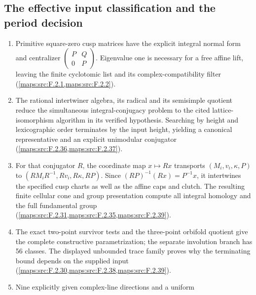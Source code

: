 \subsection{The effective input classification and the period decision}
\RungOne
\begin{enumerate}[label=\arabic*.]
\item Primitive square-zero cusp matrices have the explicit integral
  normal form and centralizer
  $\left(\begin{smallmatrix}P&Q\\0&P\end{smallmatrix}\right)$.
  Eigenvalue one is necessary for a free affine lift, leaving the
  finite cyclotomic list and its complex-compatibility filter
  (\cref{maps:src:F.2.1,maps:src:F.2.2}).
\item The rational intertwiner algebra, its radical and its
  semisimple quotient reduce the simultaneous integral-conjugacy
  problem to the cited lattice-isomorphism algorithm in its verified
  hypothesis.  Searching by height and lexicographic order terminates
  by the input height, yielding a canonical representative and an
  explicit unimodular conjugator (\cref{maps:src:F.2.36,maps:src:F.2.37}).
\item For that conjugator $R$, the coordinate map $x\mapsto Rx$
  transports $(M_i,v_i,\kappa,P)$ to
  $(RM_iR^{-1},Rv_i,R\kappa,RP)$.  Since
  $(RP)^{-1}(Rx)=P^{-1}x$, it intertwines the specified cusp charts
  as well as the affine caps and clutch.  The resulting finite
  cellular cone and group presentation compute all integral homology
  and the full fundamental group (\cref{maps:src:F.2.31,maps:src:F.2.35,maps:src:F.2.39}).
\item The exact two-point survivor tests and the three-point
  orbifold quotient give the complete constructive parametrization;
  the separate involution branch has 56 classes.  The displayed
  unbounded trace family proves why the terminating bound depends on
  the supplied input (\cref{maps:src:F.2.30,maps:src:F.2.38,maps:src:F.2.39}).
\item Nine explicitly given complex-line directions and a uniform

\end{enumerate}
